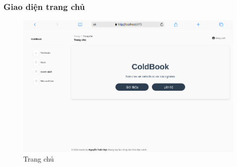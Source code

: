 \subsubsection{Giao diện trang chủ}
\begin{figure}[H]
  \centering
  \includegraphics[width=1\textwidth]{report/images/admin/trangchu.png}
  \caption{Trang chủ}
\end{figure}